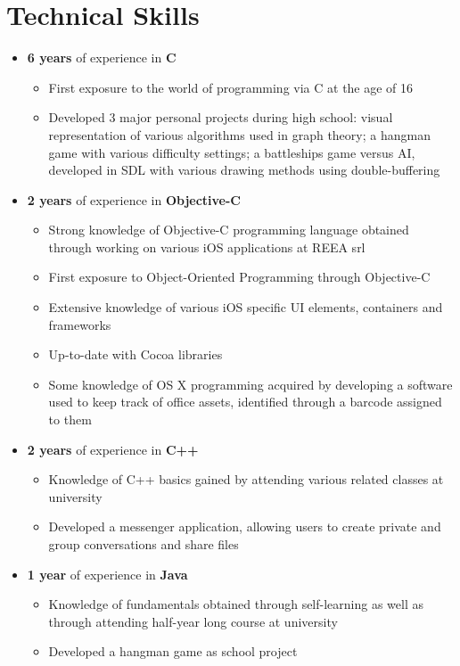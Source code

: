 \documentclass[11pt, a4paper, sans]{moderncv}
\begin{document}
\section{Technical Skills}
\begin{itemize}
\item {\textbf{6 years} of experience in \textbf{C}}
	{\begin{itemize}
			\item First exposure to the world of programming via C at the age of 16
			\item Developed 3 major personal projects during high school: visual representation of various algorithms used in graph theory; a hangman game with various difficulty settings; a battleships game versus AI, developed in SDL with various drawing methods using double-buffering 
	\end{itemize}}
\item {\textbf{2 years} of experience in \textbf{Objective-C}}
	{\begin{itemize}
			\item Strong knowledge of Objective-C programming language obtained through working on various iOS applications at REEA srl
			\item First exposure to Object-Oriented Programming through Objective-C
			\item Extensive knowledge of various iOS specific UI elements, containers and frameworks
			\item Up-to-date with Cocoa libraries
			\item Some knowledge of OS X programming acquired by developing a software used to keep track of office assets, identified through a barcode assigned to them
	\end{itemize}}
\item {\textbf{2 years} of experience in \textbf{C++}}
{\begin{itemize}
		\item Knowledge of C++ basics gained by attending various related classes at university 
		\item Developed a messenger application, allowing users to create private and group conversations and share files
	\end{itemize}}
\item {\textbf{1 year} of experience in \textbf{Java}}
{\begin{itemize}
		\item Knowledge of fundamentals obtained through self-learning as well as through attending half-year long course at university
		\item Developed a hangman game as school project
	\end{itemize}}
\end{itemize}
\end{document}
